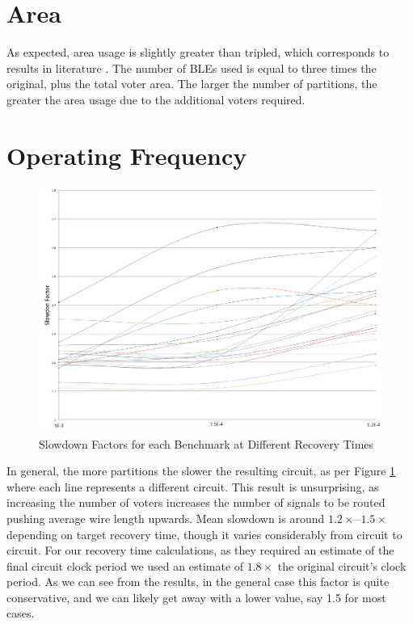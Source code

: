 \documentclass[12pt,final,oneside]{dwThesis} %
\begin{document}
   \section{Area}
   As expected, area usage is slightly greater than tripled,
   which corresponds to results in literature \cite{HardeningTechniques}. The
   number of \glspl{BLE} used is equal to three times the original, plus the
   total voter area. The larger the number of partitions, the greater the area
   usage due to the additional voters required.


   \section{Operating Frequency}
      \begin{figure}

      \begin{center}

         \includegraphics[width=\textwidth]{images/slowdown.png}
         \caption{Slowdown Factors for each Benchmark at Different Recovery Times} \label{slowdownFig} 
      \end{center}


   \end{figure}
   In general, the more partitions the slower the
   resulting circuit, as per Figure \ref{slowdownFig} where each line represents a different circuit. This result is unsurprising, as increasing the number of
   voters increases the number of signals to be routed pushing average wire
   length upwards. Mean slowdown is around $1.2\times$--$1.5\times$ depending on target recovery time, though
   it varies considerably from circuit to circuit.  For our recovery time
   calculations, as they required an estimate of the final circuit clock period
   we used an estimate of $1.8\times$ the original circuit's clock period. As
   we can see from the results, in the general case this factor is quite
   conservative, and we can likely get away with a lower value, say 1.5 for
   most cases.
   
\end{document}

